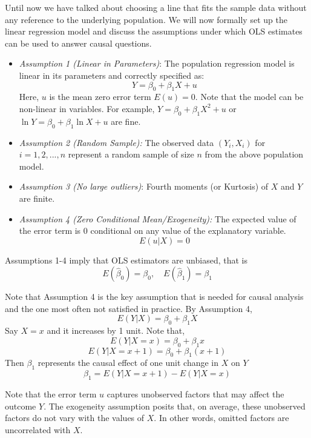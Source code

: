 \documentclass{./../../Latex/handout}
\begin{document}
Until now we have talked about choosing a line that fits the sample data without any reference to the underlying population. We will now formally set up the linear regression model and discuss the assumptions under which OLS estimates can be used to answer causal questions.
\begin{itemize}
  \item \textit{Assumption 1 (Linear in Parameters)}: The population regression model is linear in its parameters and correctly specified as:
  $$ Y = \beta_0 + \beta_1 X + u $$
  Here, $u$ is the mean zero error term $E(u)=0$.
 Note that the model can be non-linear in variables. For example, $ Y = \beta_0 + \beta_1 X^2 + u  $ or $ \ln Y = \beta_0 + \beta_1 \ln X + u  $ are fine.
\item \textit{Assumption 2 (Random Sample):} The observed data $(Y_i, X_i)$ for $i=1,2,...,n$ represent a random sample of size $n$ from the above population model.
\item \textit{Assumption 3 (No large outliers)}: Fourth moments (or Kurtosis) of $X$ and $Y$ are finite.
\item \textit{Assumption 4 (Zero Conditional Mean/Exogeneity):} The expected value of the error term is 0 conditional on any value of the explanatory variable.
$$ E(u|X)=0 $$ 
\end{itemize}

Assumptions 1-4 imply that OLS estimators are unbiased, that is
$$ E(\hat{\beta}_0) = \beta_0, \quad  E(\hat{\beta}_1) = \beta_1 $$

Note that Assumption 4 is the key assumption that is needed for causal analysis and the one most often not satisfied in practice. By Assumption 4, 
 $$ E(Y|X) = \beta_0 + \beta_1 X $$
Say $X=x$ and it increases by 1 unit. Note that,  
  $$ E(Y|X=x) = \beta_0 + \beta_1 x $$
  $$ E(Y|X=x+1) = \beta_0 + \beta_1 (x+1) $$
  Then $\beta_1$ represents the causal effect of one unit change in $X$ on $Y$
$$\beta_1 = E(Y|X=x+1)-E(Y|X=x) $$

Note that the error term $u$ captures unobserved factors that may affect the outcome $Y$. The exogeneity assumption posits that, on average, these unobserved factors do not vary with the values of $X$. In other words, omitted factors are uncorrelated with $X$. 
 
\end{document}
